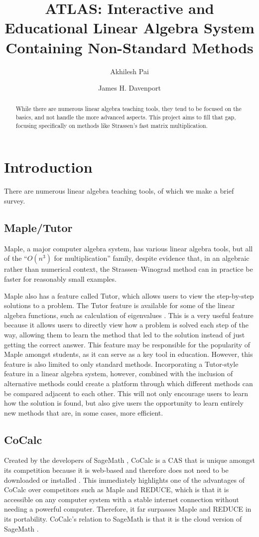 \documentclass[natbib]{llncs}
\title{ATLAS: Interactive and Educational Linear Algebra System Containing Non-Standard Methods}
\author{Akhilesh Pai\inst{1} \and James H. Davenport\inst{1}}
\institute{
  University of Bath, Bath BA2 7AY, UK\\
  \email{abp43@bath.ac.uk}\\ \email{J.H.Davenport@bath.ac.uk} 
}
\begin{document}
\maketitle

\begin{abstract}
While there are numerous linear algebra teaching tools, they tend to be focused on the basics, and not handle the more advanced aspects. This project aims to fill that gap, focusing specifically on methods like Strassen's fast matrix multiplication.
\end{abstract}
\section{Introduction}
There are numerous linear algebra teaching tools, of which we make a brief survey.
\subsection{Maple/Tutor}
Maple, a major computer algebra system, has various linear algebra tools, but all of the ``$O(n^3)$ for multiplication'' family, despite evidence \cite{Tonksetal2017a} that, in an algebraic rather than numerical context, the Strassen--Winograd \cite{Strassen1969,Winograd1971} method can in practice be faster for reasonably small examples.

Maple also has a feature called Tutor, which allows users to view the step-by-step solutions to a problem. The Tutor feature is available for some of the linear algebra functions, such as calculation of eigenvalues \cite{eigentutor}.  This is a very useful feature because it allows users to directly view how a problem
is solved each step of the way, allowing them to learn the method that led to the solution instead of just
getting the correct answer. This feature may be responsible for the popularity of Maple amongst students,
as it can serve as a key tool in education. However, this feature is also limited to only standard methods.
Incorporating a Tutor-style feature in a linear algebra system, however, combined with the inclusion of
alternative methods could create a platform through which different methods can be compared adjacent
to each other. This will not only encourage users to learn how the solution is found, but also give users
the opportunity to learn entirely new methods that are, in some cases, more efficient.
\subsection{CoCalc}
Created by the developers of SageMath \cite{sagemath}, CoCalc is a CAS that is unique amongst its competition because it is web-based and therefore does not need to be downloaded or installed \cite{cocalc}. This immediately highlights one of the advantages of CoCalc over competitors such as Maple and REDUCE, which is that it is accessible on any computer system with a stable internet connection without needing a powerful computer. Therefore, it far surpasses Maple and REDUCE in its portability. CoCalc's relation to SageMath is that it is the cloud version of SageMath \cite{sagebook}.
\end{document}
